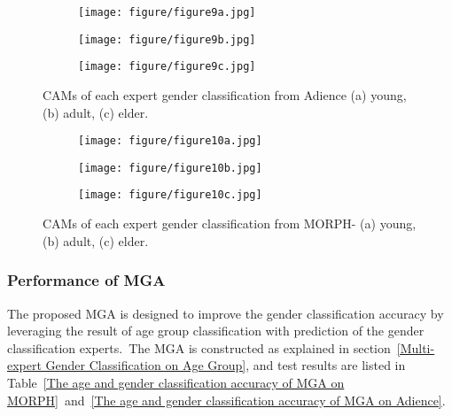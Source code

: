\documentclass[10pt,twocolumn,letterpaper]{article}
\begin{document}
\begin{figure}[!t]
\centering
\begin{subfigure}[t]{\linewidth}
    \centering
    \texttt{[image: figure/figure9a.jpg]}
    \caption{}
    \label{fig:figure_9a}
\end{subfigure}

\begin{subfigure}[t]{\linewidth}
    \centering
    \texttt{[image: figure/figure9b.jpg]}
    \caption{}
    \label{fig:figure_9b}
\end{subfigure}

\begin{subfigure}[t]{\linewidth}
    \centering
    \texttt{[image: figure/figure9c.jpg]}
    \caption{}
    \label{fig:figure_9c}
\end{subfigure}
\caption{CAMs of each expert gender classification from Adience (a) young, (b) adult, (c) elder.}
\label{fig:figure_9}
\end{figure}


\begin{figure}[!t]
\centering
\begin{subfigure}[t]{\linewidth}
    \centering
    \texttt{[image: figure/figure10a.jpg]}
    \caption{}
    \label{fig:figure_10a}
\end{subfigure}

\begin{subfigure}[t]{\linewidth}
    \centering
    \texttt{[image: figure/figure10b.jpg]}
    \caption{}
    \label{fig:figure_10b}
\end{subfigure}

\begin{subfigure}[t]{\linewidth}
    \centering
    \texttt{[image: figure/figure10c.jpg]}
    \caption{}
    \label{fig:figure_10c}
\end{subfigure}
\caption{CAMs of each expert gender classification from MORPH- (a) young, (b) adult, (c) elder.}
\label{fig:figure_10}
\end{figure}



\subsubsection{Performance of MGA}
The proposed MGA is designed to improve the gender classification accuracy by leveraging the result of age group classification with prediction of the gender classification experts.~The MGA is constructed as explained in section~\ref{Multi-expert Gender Classification on Age Group}, and test results are listed in Table~\ref{The age and gender classification accuracy of MGA on MORPH}~and~\ref{The age and gender classification accuracy of MGA on Adience}.
\end{document}
